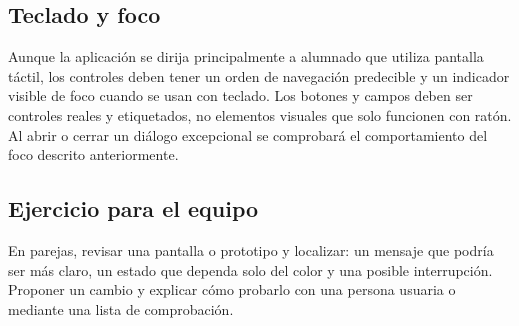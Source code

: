 \subsection{Teclado y foco}
Aunque la aplicación se dirija principalmente a alumnado que utiliza pantalla táctil, los controles deben tener un orden de navegación predecible y un indicador visible de foco cuando se usan con teclado. Los botones y campos deben ser controles reales y etiquetados, no elementos visuales que solo funcionen con ratón. Al abrir o cerrar un diálogo excepcional se comprobará el comportamiento del foco descrito anteriormente.

\subsection{Ejercicio para el equipo}
En parejas, revisar una pantalla o prototipo y localizar: un mensaje que podría ser más claro, un estado que dependa solo del color y una posible interrupción. Proponer un cambio y explicar cómo probarlo con una persona usuaria o mediante una lista de comprobación.